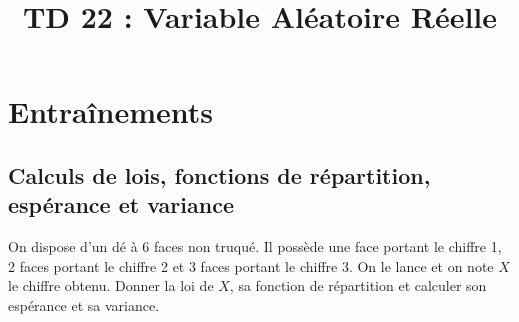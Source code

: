 \documentclass[a4paper, 11pt,reqno]{article}
\newcommand{\type}{TD }
\begin{document}
\title{\type 22 : Variable Aléatoire Réelle}


\vspace{0.2cm}
\section*{Entraînements}
\subsection*{Calculs de lois, fonctions de r\'epartition, esp\'erance et variance}


\begin{exercice}  \;
	On dispose d'un d\'e \`a 6 faces non truqu\'e. Il poss\`ede une face portant le chiffre 1, 2 faces portant le chiffre 2 et 3 faces portant le chiffre 3. On le lance et on note $X$ le chiffre obtenu. Donner la loi de $X$, sa fonction de r\'epartition et calculer son esp\'erance et sa variance.
\end{exercice}
\end{document}
